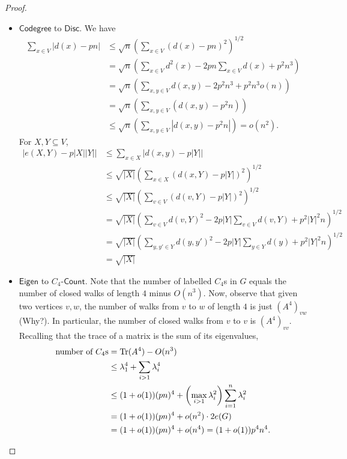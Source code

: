 \begin{proof}
\begin{itemize}
					\item $\mathsf{Codegree}$ to $\mathsf{Disc}$. We have
					\begin{align*}
						\sum_{x\in V} |d(x) - pn| &\le \sqrt{n} \left( \sum_{x\in V} (d(x)-pn)^2 \right)^{1/2} \\
							&= \sqrt{n} \left( \sum_{x\in V} d^2(x) - 2pn \sum_{x\in V}d(x) + p^2n^3 \right) \\
							&= \sqrt{n} \left( \sum_{x,y\in V} d(x,y) - 2p^2n^3 + p^2n^3 o(n) \right) \\
							&= \sqrt{n} \left( \sum_{x,y \in V} \left(d(x,y) - p^2n\right) \right) \\
							&\le \sqrt{n} \left( \sum_{x,y \in V} \left|d(x,y) - p^2n\right| \right) = o(n^2).
					\end{align*}
					For $X,Y\subseteq V$,
					\begin{align*}
						\left| e(X,Y) - p|X||Y| \right| &\le \sum_{x\in X} \left| d(x,y) - p|Y| \right| \\
						&\le \sqrt{|X|} \left( \sum_{x\in X} (d(x,Y) - p|Y|)^2 \right)^{1/2} \\
						&\le \sqrt{|X|} \left( \sum_{v\in V} (d(v,Y) - p|Y|)^2 \right)^{1/2} \\
						&= \sqrt{|X|} \left( \sum_{v\in V} d(v,Y)^2 - 2p|Y|\sum_{v\in V} d(v,Y) + p^2 |Y|^2 n \right)^{1/2} \\
						&= \sqrt{|X|} \left( \sum_{y,y'\in Y} d(y,y')^2 - 2p|Y|\sum_{y\in Y} d(y) + p^2 |Y|^2 n \right)^{1/2} \\
						&= \sqrt{|X|} 
					\end{align*}

					\item $\mathsf{Eigen}$ to $C_4$-$\mathsf{Count}$. Note that the number of labelled $C_4$s in $G$ equals the number of closed walks of length $4$ minus $O(n^3)$. Now, observe that given two vertices $v,w$, the number of walks from $v$ to $w$ of length $4$ is just $(A^4)_{vw}$ (Why?). In particular, the number of closed walks from $v$ to $v$ is $(A^4)_{vv}$. Recalling that the trace of a matrix is the sum of its eigenvalues,
					\begin{align*}
						\text{number of $C_4$s} &= \operatorname{Tr}(A^4) - O(n^3) \\
							&\le \lambda_1^4 + \sum_{i>1} \lambda_i^4 \\
							&\le (1+o(1)) (pn)^4 + \left(\max_{i>1} \lambda_i^2\right) \sum_{i=1}^n \lambda_i^2 \\
							&= (1+o(1)) (pn)^4 + o(n^2) \cdot 2e(G) \\
							&= (1+o(1)) (pn)^4 + o(n^4) = (1+o(1)) p^4 n^4.
					\end{align*}


\end{itemize}
\end{proof}
